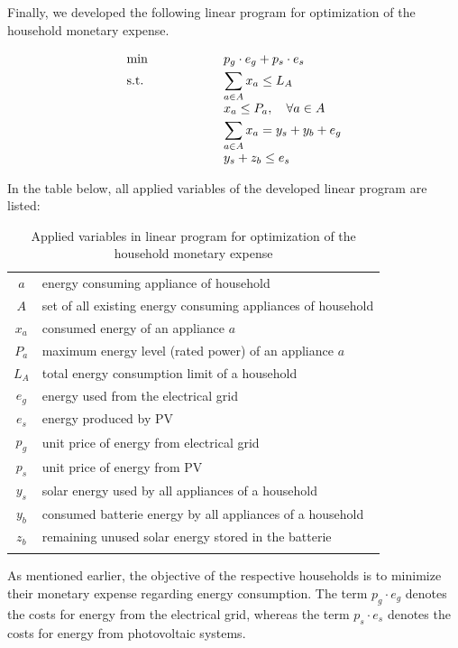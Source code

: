Finally, we developed the following linear program for optimization of the household monetary expense.

\begin{equation}
 \begin{array}{ll@{}ll}
 \text{min} & \displaystyle p_{g} \cdot e_{g} + p_{s} \cdot e_{s} &\\
 \text{s.t.}& \displaystyle \sum\limits_{a \in A}^{} x_{a} \leq L_{A} \\
                    & \displaystyle x_{a} \leq P_{a}, \quad \forall a \in A \\
                    & \displaystyle \sum\limits_{a \in A}^{} x_{a} = y_{s} + y_{b} + e_{g} \\
                    & \displaystyle y_{s} + z_{b} \leq e_{s}
 \end{array}
\end{equation}

\clearpage
In the table below, all applied variables of the developed linear program are listed:

\begin{longtable}{c|l}
	\hline
    $a$ & energy consuming appliance of household \\
	$A$ & set of all existing energy consuming appliances of household \\
	$x_{a}$ & consumed energy of an appliance $a$ \\
	$P_{a}$ & maximum energy level (rated power) of an appliance $a$ \\
	$L_{A}$ & total energy consumption limit of a household \\
	$e_{g}$ & energy used from the electrical grid \\
	$e_{s}$ & energy produced by PV \\
	$p_{g}$ & unit price of energy from electrical grid \\
	$p_{s}$ & unit price of energy from PV \\
	$y_{s}$ & solar energy used by all appliances of a household \\
	$y_{b}$ & consumed batterie energy by all appliances of a household \\
	$z_{b}$ & remaining unused solar energy stored in the batterie \\
	\hline
	\caption{Applied variables in linear program for optimization of the household monetary expense}
	\label{table:applied_variables_lp}
\end{longtable} 

As mentioned earlier,
the objective of the respective households is to minimize
their monetary expense regarding energy consumption.
The term $p_{g} \cdot e_{g}$ denotes the costs for energy from the electrical
grid, whereas the term $p_{s} \cdot e_{s}$ denotes the costs for energy from photovoltaic systems. 


